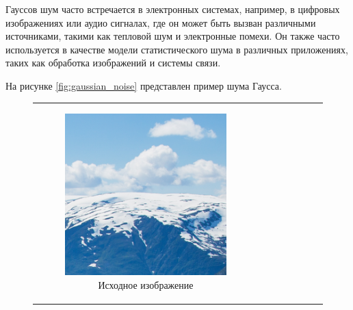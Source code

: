Гауссов шум часто встречается в электронных системах, например, в цифровых изображениях или аудио сигналах, где он может быть вызван различными источниками, такими как тепловой шум и электронные помехи. Он также часто используется в качестве модели статистического шума в различных приложениях, таких как обработка изображений и системы связи.

На рисунке \ref{fig:gaussian_noise} представлен пример шума Гаусса.

\begin{figure}[h!]
  \centering
  \begin{tabular}{cc}
    \begin{subfigure}{0.45\textwidth}
      \includegraphics[width=\linewidth]{inc/analysis/noises/original.png}
      \caption{Исходное изображение}
    \end{subfigure} &
    \begin{subfigure}{0.45\textwidth}

\end{subfigure}
\end{tabular}
\end{figure}
